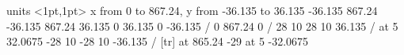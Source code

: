 \documentclass[12pt,legalpaper]{article}
\begin{document}
\begin{landscape}

\beginpicture
\setcoordinatesystem units <1pt,1pt>
\setplotarea x from 0 to 867.24, y from -36.135 to 36.135
 -36.135 867.24 -36.135 867.24 36.135 0 36.135 0 -36.135 /
 0 867.24 0 /
 28 10 28 10 36.135 /
 at 5 32.0675
 -28 10 -28 10 -36.135 /
 [tr] at 865.24 -29
 at 5 -32.0675
\endpicture

\end{landscape}
\end{document}
